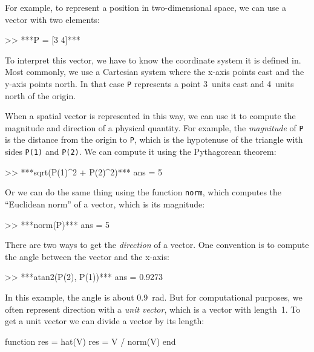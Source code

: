 For example, to represent a position in two-dimensional space, we can use a vector with two elements:

\begin{code}
>> ***P = [3 4]***
\end{code}

To interpret this vector, we have to know the coordinate system it is defined in.  Most commonly, we use a Cartesian system where the x-axis points east and the y-axis points north.  In that case \lstinline{P} represents a point 3~units east and 4~units north of the origin.


When a spatial vector is represented in this way, we can use it to compute the magnitude and direction of a physical quantity.  
For example, the {\em magnitude} of \lstinline{P} is the distance from the origin to \lstinline{P}, which is the hypotenuse of the triangle with sides \lstinline{P(1)} and \lstinline{P(2)}.  
We can compute it using the Pythagorean theorem:

\begin{code}
>> ***sqrt(P(1)^2 + P(2)^2)***
ans = 5
\end{code}

Or we can do the same thing using the function \lstinline{norm}, which computes the
``Euclidean norm'' of a vector, which is its magnitude:


\begin{code}
>> ***norm(P)***
ans = 5
\end{code}

There are two ways to get the {\em direction} of a vector.  One convention is to compute the angle between the vector and the x-axis:

\begin{code}
>> ***atan2(P(2), P(1))***
ans = 0.9273
\end{code}

In this example, the angle is about \SI{0.9}{\radian}.  But for computational purposes, we often represent direction with a \emph{unit vector}, which is a vector with length~1.  To get a unit vector we can divide a vector by its length:

\begin{code}
function res = hat(V)
    res = V / norm(V)
end
\end{code}
 
